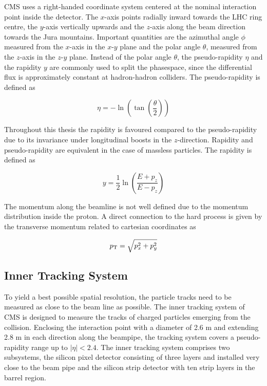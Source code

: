 CMS uses a right-handed coordinate system centered at the nominal interaction point inside the
detector. The $x$-axis points radially inward towards the LHC ring centre, the
$y$-axis vertically upwards and the $z$-axis along the beam direction towards
the Jura mountains. Important quantities are the azimuthal angle $\phi$
measured from the $x$-axis in the $x$-$y$ plane and the polar angle $\theta$,
measured from the $z$-axis in the $z$-$y$ plane. Instead of the polar angle
$\theta$, the pseudo-rapidity $\eta$ and the rapidity $y$ are commonly used to
split the phasespace, since the differential flux is approximately constant at
hadron-hadron colliders. The pseudo-rapidity is defined as

\begin{equation*}
    \eta = - \ln \left( \tan \left( \frac{\theta}{2} \right) \right)
\end{equation*}

Throughout this thesis the rapidity is favoured compared to the pseudo-rapidity
due to its invariance under longitudinal boosts in the $z$-direction. Rapidity
and pseudo-rapidity are equivalent in the case of massless particles. The
rapidity is defined as

\begin{equation*}
    y = \frac{1}{2} \ln \left( \frac{E + p_z}{E - p_z} \right) 
\end{equation*}

The momentum along the beamline is not well defined due to the momentum
distribution inside the proton. A direct connection to the hard process is given
by the transverse momentum \pt related to cartesian coordinates as

\begin{equation*}
    p_{\mathrm{T}} = \sqrt{p_x^2 + p_y^2}
\end{equation*}

\subsection{Inner Tracking System}

To yield a best possible spatial resolution, the particle tracks need to be
measured as close to the beam line as possible. The inner tracking system of CMS
is designed to measure the tracks of charged particles emerging from the
collision. Enclosing the interaction point with a diameter of 2.6 m and
extending 2.8 m in each direction along the beampipe, the tracking system covers a
pseudo-rapidity range up to $|\eta| < 2.4$. The inner tracking system comprises
two subsystems, the silicon pixel detector consisting of three layers and
installed very close to the beam pipe and the silicon strip detector with ten
strip layers in the barrel region. 

